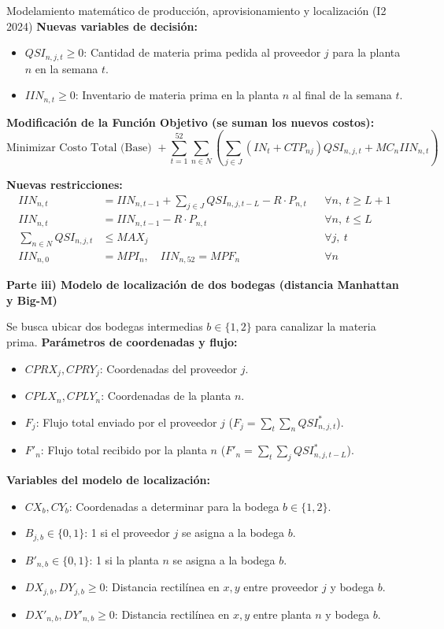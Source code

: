 \begin{ejercicio}{Modelamiento matemático de producción, aprovisionamiento y localización (I2 2024)}
\textbf{Nuevas variables de decisión:}
\begin{itemize}[leftmargin=1.4em, itemsep=0pt]
  \item $QSI_{n,j,t} \ge 0$: Cantidad de materia prima pedida al proveedor $j$ para la planta $n$ en la semana $t$.
  \item $IIN_{n,t} \ge 0$: Inventario de materia prima en la planta $n$ al final de la semana $t$.
\end{itemize}

\textbf{Modificación de la Función Objetivo (se suman los nuevos costos):}
\[
  \text{Minimizar Costo Total (Base) } + \sum_{t=1}^{52} \sum_{n \in N} \left( \sum_{j\in J} (IN_t + CTP_{nj}) QSI_{n,j,t} + MC_n IIN_{n,t} \right)
\]

\textbf{Nuevas restricciones:}
\begin{align*}
  IIN_{n,t} &= IIN_{n,t-1} + \sum_{j\in J} QSI_{n,j,t-L} - R \cdot P_{n,t} && \forall n,\ t \ge L+1 \\
  IIN_{n,t} &= IIN_{n,t-1} - R \cdot P_{n,t} && \forall n,\ t \le L \\
  \sum_{n\in N} QSI_{n,j,t} &\le MAX_j && \forall j,\ t \\
  IIN_{n,0} &= MPI_n, \quad IIN_{n,52} = MPF_n && \forall n
\end{align*}

\textbf{Parte iii) Modelo de localización de dos bodegas (distancia Manhattan y Big-M)}

Se busca ubicar dos bodegas intermedias $b \in \{1, 2\}$ para canalizar la materia prima.
\textbf{Parámetros de coordenadas y flujo:}
\begin{itemize}[leftmargin=1.4em, itemsep=0pt]
  \item $CPRX_j, CPRY_j$: Coordenadas del proveedor $j$.
  \item $CPLX_n, CPLY_n$: Coordenadas de la planta $n$.
  \item $F_j$: Flujo total enviado por el proveedor $j$ ($F_j = \sum_{t} \sum_{n} QSI_{n,j,t}^*$).
  \item $F'_n$: Flujo total recibido por la planta $n$ ($F'_n = \sum_{t} \sum_{j} QSI_{n,j,t-L}^*$).
\end{itemize}

\textbf{Variables del modelo de localización:}
\begin{itemize}[leftmargin=1.4em, itemsep=0pt]
  \item $CX_b, CY_b$: Coordenadas a determinar para la bodega $b \in \{1, 2\}$.
  \item $B_{j,b} \in \{0, 1\}$: 1 si el proveedor $j$ se asigna a la bodega $b$.
  \item $B'_{n,b} \in \{0, 1\}$: 1 si la planta $n$ se asigna a la bodega $b$.
  \item $DX_{j,b}, DY_{j,b} \ge 0$: Distancia rectilínea en $x, y$ entre proveedor $j$ y bodega $b$.
  \item $DX'_{n,b}, DY'_{n,b} \ge 0$: Distancia rectilínea en $x, y$ entre planta $n$ y bodega $b$.
\end{itemize}


\end{ejercicio}
